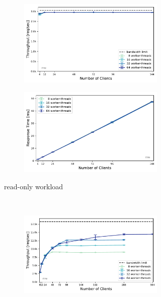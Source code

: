 \documentclass[report.tex]{subfiles}
\begin{document}
\begin{figure}[H] 
\begin{subfigure}{\linewidth}
	\begin{subfigure}[b]{.49\linewidth}
		\centering
		\includegraphics[width=\linewidth]{data/exp32_ro_tp_nc_w.pdf}
	\end{subfigure}\hfill
	\begin{subfigure}[b]{.49\linewidth}
		\centering
		\includegraphics[width=\linewidth]{data/exp32_ro_rt_nc_w.pdf}
	\end{subfigure}%
	\caption{read-only workload}\label{exp32_ro_tp_nc}
\end{subfigure}
\\[1ex]
\begin{subfigure}{\linewidth}
	\begin{subfigure}[b]{.49\linewidth}
		\centering
		\includegraphics[width=\linewidth]{data/exp32_wo_tp_nc_w.pdf}

\end{subfigure}
\end{subfigure}
\end{figure}
\end{document}
